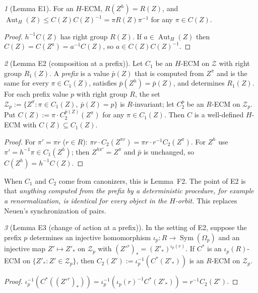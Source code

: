 \documentclass[11pt]{article}
\theoremstyle{plain}
\theoremstyle{definition}
\theoremstyle{remark}
\theoremstyle{named}
\newtheorem*{named}{}
\theoremstyle{namedrm}
\newcommand{\Sym}{\operatorname{Sym}}
\newcommand{\Aut}{\operatorname{Aut}}
\newcommand{\cZ}{\mathcal{Z}}
\begin{document}
\begin{named}[Lemma E1]
For an $H$-ECM, $R(Z^h)=R(Z)$, and $\Aut_H(Z)\le C(Z)C(Z)^{-1}=\pi R(Z)\pi^{-1}$ for any $\pi\in C(Z)$.
\end{named}
\begin{proof}
$h^{-1}C(Z)$ has right group $R(Z)$. If $a\in\Aut_H(Z)$ then $C(Z)=C(Z^a)=a^{-1}C(Z)$, so $a\in C(Z)C(Z)^{-1}$.
\end{proof}

\begin{named}[Lemma E2 (composition at a prefix)]
Let $C_1$ be an $H$-ECM on $\cZ$ with right group $R_1(Z)$. A \emph{prefix} is a value $\bar p(Z)$ that is
computed from $Z^\pi$ and is the same for every $\pi\in C_1(Z)$, satisfies $\bar p(Z^h)=\bar p(Z)$, and
determines $R_1(Z)$. For each prefix value $p$ with right group $R$, the set
$\cZ_p:=\{Z^\pi:\pi\in C_1(Z),\ \bar p(Z)=p\}$ is $R$-invariant; let $C_2^p$ be an $R$-ECM on $\cZ_p$. Put
$C(Z):=\pi\cdot C_2^{\bar p(Z)}(Z^\pi)$ for any $\pi\in C_1(Z)$. Then $C$ is a well-defined $H$-ECM with
$C(Z)\subseteq C_1(Z)$.
\end{named}
\begin{proof}
For $\pi'=\pi r$ ($r\in R$): $\pi r\cdot C_2(Z^{\pi r})=\pi r\cdot r^{-1}C_2(Z^\pi)$. For $Z^h$ use
$\pi'=h^{-1}\pi\in C_1(Z^h)$; then $Z^{h\pi'}=Z^\pi$ and $\bar p$ is unchanged, so $C(Z^h)=h^{-1}C(Z)$.
\end{proof}
When $C_1$ and $C_2$ come from canonizers, this is Lemma~F2. The point of E2 is that \emph{anything computed
from the prefix by a deterministic procedure, for example a renormalization, is identical for every object
in the $H$-orbit.} This replaces Neuen's synchronization of pairs.

\begin{named}[Lemma E3 (change of action at a prefix)]
In the setting of E2, suppose the prefix $p$ determines an injective homomorphism
$\iota_p\colon R\to\Sym(\Omega_p)$ and an injective map $Z'\mapsto Z'_*$ on $\cZ_p$ with
$(Z'^r)_*=(Z'_*)^{\iota_p(r)}$. If $C^*$ is an $\iota_p(R)$-ECM on $\{Z'_*:Z'\in\cZ_p\}$, then
$C_2(Z'):=\iota_p^{-1}(C^*(Z'_*))$ is an $R$-ECM on $\cZ_p$.
\end{named}
\begin{proof}
$\iota_p^{-1}(C^*((Z'^r)_*))=\iota_p^{-1}(\iota_p(r)^{-1}C^*(Z'_*))=r^{-1}C_2(Z')$.
\end{proof}
\end{document}
